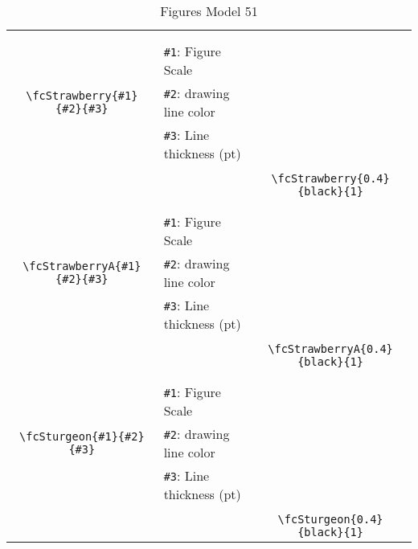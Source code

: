 \documentclass[x11names]{article}
\begin{document}
\begin{table}[H]
\begin{tabular}{|c|l|c|}
	&&\multirow{5}{*}{\fcStrawberry{0.4}{black}{1}}\\	&&\\	&\verb|#1|: Figure Scale &\\	\verb|\fcStrawberry{#1}{#2}{#3}|&	\verb|#2|: drawing line color &\\	&\verb|#3|: Line thickness (pt) &\\ &&\\&&	\verb|\fcStrawberry{0.4}{black}{1}|\\\hline 	
	&&\multirow{5}{*}{\fcStrawberryA{0.4}{black}{1}}\\	&&\\	&\verb|#1|: Figure Scale &\\	\verb|\fcStrawberryA{#1}{#2}{#3}|&	\verb|#2|: drawing line color &\\	&\verb|#3|: Line thickness (pt) &\\ &&\\&&	\verb|\fcStrawberryA{0.4}{black}{1}|\\\hline 	
	&&\multirow{5}{*}{\fcSturgeon{0.4}{black}{1}}\\	&&\\	&\verb|#1|: Figure Scale &\\	\verb|\fcSturgeon{#1}{#2}{#3}|&	\verb|#2|: drawing line color &\\	&\verb|#3|: Line thickness (pt) &\\ &&\\&&	\verb|\fcSturgeon{0.4}{black}{1}|\\\hline 	\hline\end{tabular}\caption{Figures Model 51}\label{tab51}\end{table}
\end{document}
